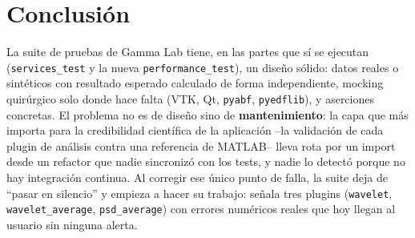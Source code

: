 \documentclass[11pt,a4paper]{article}
\begin{document}
\section{Conclusión}

La suite de pruebas de Gamma Lab tiene, en las partes que sí se ejecutan
(\texttt{services\_\allowbreak test} y la nueva \texttt{performance\_\allowbreak test}), un diseño sólido: datos reales o sintéticos
con resultado esperado calculado de forma independiente, mocking quirúrgico solo donde hace falta (VTK, Qt,
\texttt{pyabf}, \texttt{pyedflib}), y aserciones concretas. El problema no es de diseño sino de
\textbf{mantenimiento}: la capa que más importa para la credibilidad científica de la aplicación --la
validación de cada plugin de análisis contra una referencia de MATLAB-- lleva rota por un import desde un
refactor que nadie sincronizó con los tests, y nadie lo detectó porque no hay integración continua. Al
corregir ese único punto de falla, la suite deja de ``pasar en silencio'' y empieza a hacer su trabajo:
señala tres plugins (\texttt{wavelet}, \texttt{wavelet\_\allowbreak average}, \texttt{psd\_\allowbreak average}) con errores
numéricos reales que hoy llegan al usuario sin ninguna alerta.
\end{document}
